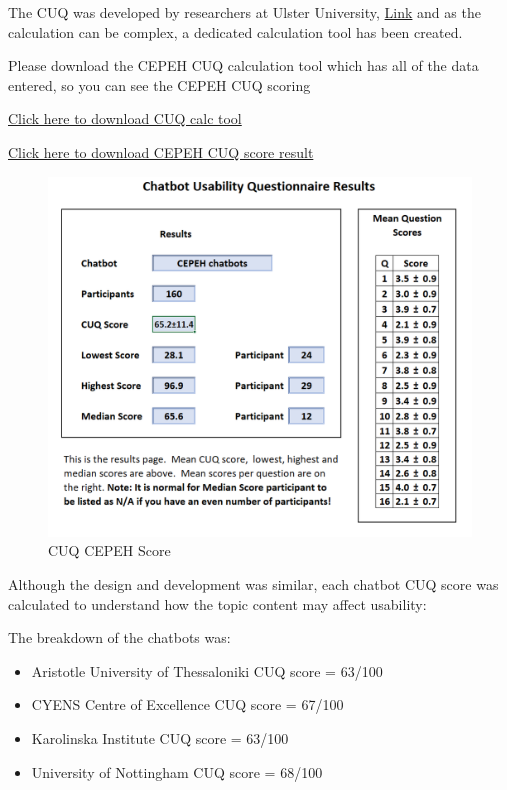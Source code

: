 \documentclass[a4paper, nobind]{templates/ociamthesis}
\providecommand{\tightlist}{%
  \setlength{\itemsep}{0pt}\setlength{\parskip}{0pt}}
\begin{document}
The CUQ was developed by researchers at Ulster University,
\href{https://www.ulster.ac.uk/research/topic/computer-science/artificial-intelligence/projects/cuq}{Link}
and as the calculation can be complex, a dedicated calculation tool has been created.

Please download the CEPEH CUQ calculation tool which has all of the data entered, so you can see the CEPEH CUQ scoring

\href{CUQ-Calculation-Tool.xlsx}{Click here to download CUQ calc tool}

\href{cuq.png}{Click here to download CEPEH CUQ score result}

\begin{figure}

{\centering \includegraphics[width=0.75\linewidth]{cuq} 

}

\caption{CUQ CEPEH Score}\label{fig:cuqimage}
\end{figure}

Although the design and development was similar, each chatbot CUQ score was calculated to understand how the topic content may affect usability:

The breakdown of the chatbots was:

\begin{itemize}
\tightlist
\item
  Aristotle University of Thessaloniki CUQ score = 63/100
\item
  CYENS Centre of Excellence CUQ score = 67/100
\item
  Karolinska Institute CUQ score = 63/100
\item
  University of Nottingham CUQ score = 68/100
\end{itemize}
\end{document}
